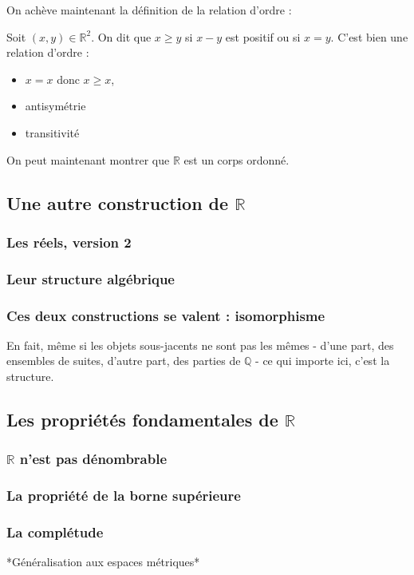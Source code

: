 On achève maintenant la définition de la relation d'ordre :
\begin{defini}
    Soit $(x,y)\in \mathbb{R}^2$. On dit que $x\geq y$ si $x-y$ est positif ou si $x=y$.
    \tcblower
    C'est bien une relation d'ordre :
    \begin{itemize}
        \item $x=x$ donc $x\geq x$,
        \item antisymétrie
        \item transitivité 
    \end{itemize}
\end{defini}

On peut maintenant montrer que $\mathbb{R}$ est un corps ordonné.

\subsection{Une autre construction de $\mathbb{R}$}
\subsubsection{Les réels, version 2}
\subsubsection{Leur structure algébrique}
\subsubsection{Ces deux constructions se valent : isomorphisme}
En fait, même si les objets sous-jacents ne sont pas les mêmes - d'une part, des ensembles de suites, d'autre part, des parties de $\mathbb{Q}$ - ce qui importe ici, c'est la structure.

\subsection{Les propriétés fondamentales de $\mathbb{R}$}
\subsubsection{$\mathbb{R}$ n'est pas dénombrable}
\subsubsection{La propriété de la borne supérieure}
\subsubsection{La complétude}
*Généralisation aux espaces métriques*
